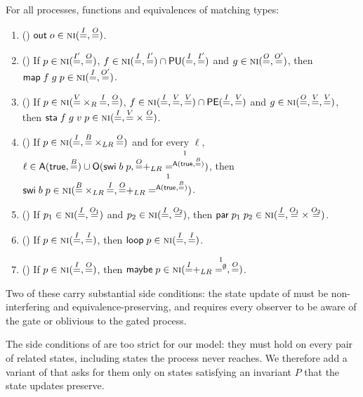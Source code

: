 \begin{theorem}\label{thm:composition}
For all processes, functions and equivalences of matching types:
\begin{enumerate}
\item\label{it:out} () $\mathsf{out}\;o \in \text{\normalfont\scshape ni}(\overset{I}{=},\overset{O}{=})$.
\item\label{it:map} () If $p \in \text{\normalfont\scshape ni}(\overset{I'}{=},\overset{O}{=})$,
  $f \in \text{\normalfont\scshape ni}(\overset{I}{=},\overset{I'}{=}) \cap \mathsf{PU}(\overset{I}{=},\overset{I'}{=})$ and
  $g \in \text{\normalfont\scshape ni}(\overset{O}{=},\overset{O'}{=})$, then
  $\mathsf{map}\;f\;g\;p \in \text{\normalfont\scshape ni}(\overset{I}{=},\overset{O'}{=})$.
\item\label{it:sta} () If $p \in \text{\normalfont\scshape ni}({\overset{V}{=}} \times_R {\overset{I}{=}},\overset{O}{=})$,
  $f \in \text{\normalfont\scshape ni}(\overset{I}{=},\overset{V}{=},\overset{V}{=}) \cap \mathsf{PE}(\overset{I}{=},\overset{V}{=})$ and
  $g \in \text{\normalfont\scshape ni}(\overset{O}{=},\overset{V}{=},\overset{V}{=})$, then
  $\mathsf{sta}\;f\;g\;v\;p \in \text{\normalfont\scshape ni}(\overset{I}{=},{\overset{V}{=}} \times {\overset{O}{=}})$.
\item\label{it:swi} () If $p \in \text{\normalfont\scshape ni}(\overset{I}{=},{\overset{B}{=}} \times_{LR} {\overset{O}{=}})$ and
  for every $\ell$,
  $\ell \in \Aw(\mathsf{true},\eqv{B}) \cup
    \Ob(\mathsf{swi}\;b\;p,\eqo{O} +_{LR} \one^{\Aw(\mathsf{true},\eqv{B})})$, then
  $\mathsf{swi}\;b\;p \in
    \NI(\eqo{B} \times_{LR} \eqo{I},\eqo{O} +_{LR} \one^{\Aw(\mathsf{true},\eqv{B})})$.
\item\label{it:par} () If $p_1 \in \text{\normalfont\scshape ni}(\overset{I}{=},\overset{O_1}{=})$ and
  $p_2 \in \text{\normalfont\scshape ni}(\overset{I}{=},\overset{O_2}{=})$, then
  $\mathsf{par}\;p_1\;p_2 \in \text{\normalfont\scshape ni}(\overset{I}{=},{\overset{O_1}{=}} \times {\overset{O_2}{=}})$.
\item\label{it:loop} () If $p \in \text{\normalfont\scshape ni}(\overset{I}{=},\overset{I}{=})$, then
  $\mathsf{loop}\;p \in \text{\normalfont\scshape ni}(\overset{I}{=},\overset{I}{=})$.
\item\label{it:maybe} () If $p \in \text{\normalfont\scshape ni}(\overset{I}{=},\overset{O}{=})$, then
  $\mathsf{maybe}\;p \in \NI(\eqo{I} +_{LR} \one^\emptyset,\eqv{O})$.
\end{enumerate}
\end{theorem}

Two of these carry substantial side conditions: the state update of  must
be non-interfering and equivalence-preserving, and  requires every observer
to be aware of the gate or oblivious to the gated process.

The side conditions of  are too strict for our model: they must hold on
every pair of related states, including states the process never reaches. We
therefore add a variant of  that asks for them only on states
satisfying an invariant $P$ that the state updates preserve.

